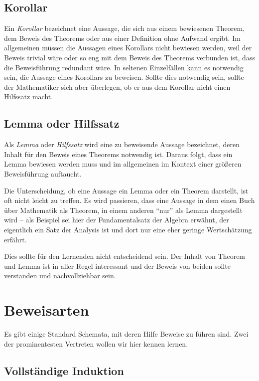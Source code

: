 \subsection{Korollar}

Ein \textsl{Korollar} bezeichnet eine Aussage, die sich aus einem bewiesenen Theorem, dem Beweis des Theorems oder aus einer Definition ohne Aufwand ergibt. Im allgemeinen müssen die Aussagen eines Korollars nicht bewiesen werden, weil der Beweis trivial wäre oder so eng mit dem Beweis des Theorems verbunden ist, dass die Beweisführung redundant wäre. In seltenen Einzelfällen kann es notwendig sein, die Aussage eines Korollars zu beweisen. Sollte dies notwendig sein, sollte der Mathematiker sich aber überlegen, ob er aus dem Korollar nicht einen Hilfssatz macht.

\subsection{Lemma oder Hilfssatz}

Als \textsl{Lemma} oder \textsl{Hilfssatz} wird eine zu beweisende Aussage bezeichnet, deren Inhalt für den Beweis eines Theorems notwendig ist. Daraus folgt, dass ein Lemma bewiesen werden muss und im allgemeinen im Kontext einer größeren Beweisführung auftaucht. 

Die Unterscheidung, ob eine Aussage ein Lemma oder ein Theorem darstellt, ist oft nicht leicht zu treffen. Es wird passieren, dass eine Aussage in dem einen Buch über Mathematik als Theorem, in einem anderen "`nur"' als Lemma dargestellt wird -- als Beispiel sei hier der Fundamentalsatz der Algebra erwähnt, der eigentlich ein Satz der Analysis ist und dort nur eine eher geringe Wertschätzung erfährt. 

Dies sollte für den Lernenden nicht entscheidend sein. Der Inhalt von Theorem und Lemma ist in aller Regel interessant und der Beweis von beiden sollte verstanden und nachvollziehbar sein. 

\section{Beweisarten}

Es gibt einige Standard Schemata, mit deren Hilfe Beweise zu führen sind. Zwei der prominentesten Vertreten wollen wir hier kennen lernen.

\subsection{Vollständige Induktion}

